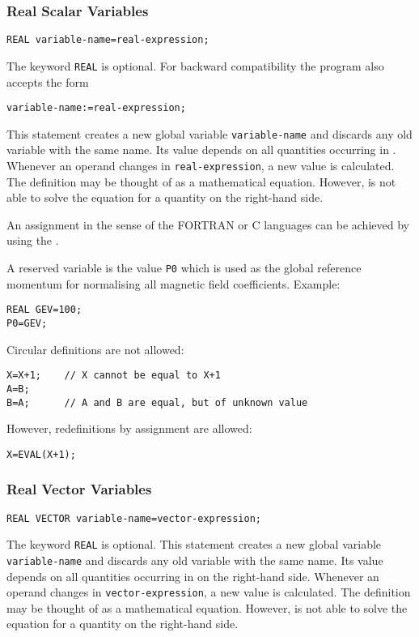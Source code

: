 \subsubsection{Real Scalar Variables}
\begin{verbatim}
REAL variable-name=real-expression;
\end{verbatim}
The keyword \texttt{REAL} is optional.
For backward compatibility the program also accepts the form
\begin{verbatim}
variable-name:=real-expression;
\end{verbatim}
This statement creates a new global variable \texttt{variable-name}
and discards any old variable with the same name.
Its value depends on all quantities occurring
in .
Whenever an operand changes in \texttt{real-expression},
a new value is calculated.
The definition may be thought of as a mathematical equation.
However, \opal is not able to solve the equation for a quantity on the
right-hand side.

An assignment in the sense of the FORTRAN or C languages can be achieved
by using the .

A reserved variable is the value \texttt{P0} which is used as the
global reference momentum for normalising all magnetic field coefficients.
\noindent Example:
\begin{verbatim}
REAL GEV=100;
P0=GEV;
\end{verbatim}
Circular definitions are not allowed:
\begin{verbatim}
X=X+1;    // X cannot be equal to X+1
A=B;
B=A;      // A and B are equal, but of unknown value
\end{verbatim}
However, redefinitions by assignment are allowed:
\begin{verbatim}
X=EVAL(X+1);
\end{verbatim}

\subsubsection{Real Vector Variables}
\begin{verbatim}
REAL VECTOR variable-name=vector-expression;
\end{verbatim}
The keyword \texttt{REAL} is optional.
This statement creates a new global variable \texttt{variable-name}
and discards any old variable with the same name.
Its value depends on all quantities occurring
in  on the right-hand side.
Whenever an operand changes in \texttt{vector-expression},
a new value is calculated.
The definition may be thought of as a mathematical equation.
However, \opal is not able to solve the equation for a quantity on the
right-hand side.

